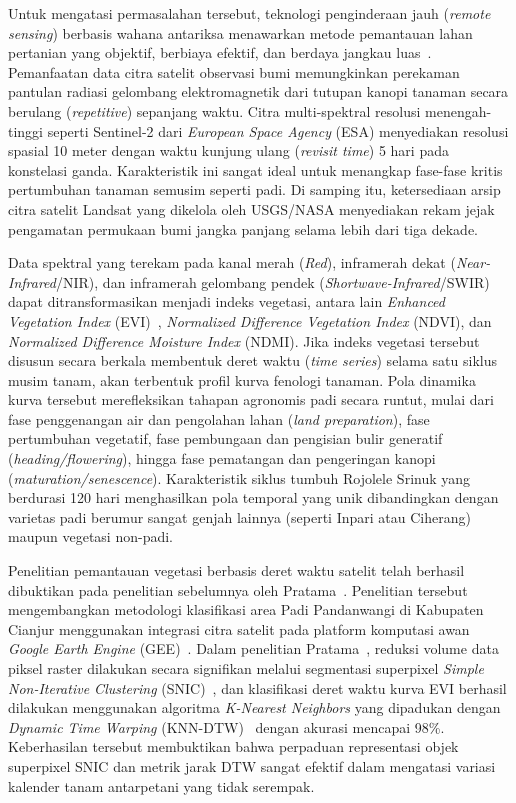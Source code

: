 Untuk mengatasi permasalahan tersebut, teknologi penginderaan jauh (\textit{remote sensing}) berbasis wahana antariksa menawarkan metode pemantauan lahan pertanian yang objektif, berbiaya efektif, dan berdaya jangkau luas~\cite{lillesand:15:remote}. Pemanfaatan data citra satelit observasi bumi memungkinkan perekaman pantulan radiasi gelombang elektromagnetik dari tutupan kanopi tanaman secara berulang (\textit{repetitive}) sepanjang waktu. Citra multi-spektral resolusi menengah-tinggi seperti Sentinel-2 dari \textit{European Space Agency} (ESA) menyediakan resolusi spasial 10 meter dengan waktu kunjung ulang (\textit{revisit time}) 5 hari pada konstelasi ganda. Karakteristik ini sangat ideal untuk menangkap fase-fase kritis pertumbuhan tanaman semusim seperti padi. Di samping itu, ketersediaan arsip citra satelit Landsat yang dikelola oleh USGS/NASA menyediakan rekam jejak pengamatan permukaan bumi jangka panjang selama lebih dari tiga dekade.

Data spektral yang terekam pada kanal merah (\textit{Red}), inframerah dekat (\textit{Near-Infrared}/NIR), dan inframerah gelombang pendek (\textit{Shortwave-Infrared}/SWIR) dapat ditransformasikan menjadi indeks vegetasi, antara lain \textit{Enhanced Vegetation Index} (EVI)~\cite{huete:02:evi}, \textit{Normalized Difference Vegetation Index} (NDVI), dan \textit{Normalized Difference Moisture Index} (NDMI). Jika indeks vegetasi tersebut disusun secara berkala membentuk deret waktu (\textit{time series}) selama satu siklus musim tanam, akan terbentuk profil kurva fenologi tanaman. Pola dinamika kurva tersebut merefleksikan tahapan agronomis padi secara runtut, mulai dari fase penggenangan air dan pengolahan lahan (\textit{land preparation}), fase pertumbuhan vegetatif, fase pembungaan dan pengisian bulir generatif (\textit{heading/flowering}), hingga fase pematangan dan pengeringan kanopi (\textit{maturation/senescence}). Karakteristik siklus tumbuh Rojolele Srinuk yang berdurasi 120 hari menghasilkan pola temporal yang unik dibandingkan dengan varietas padi berumur sangat genjah lainnya (seperti Inpari atau Ciherang) maupun vegetasi non-padi.

Penelitian pemantauan vegetasi berbasis deret waktu satelit telah berhasil dibuktikan pada penelitian sebelumnya oleh Pratama~\cite{pratama:25:vegetasi}. Penelitian tersebut mengembangkan metodologi klasifikasi area Padi Pandanwangi di Kabupaten Cianjur menggunakan integrasi citra satelit pada platform komputasi awan \textit{Google Earth Engine} (GEE)~\cite{gorelick:17:gee}. Dalam penelitian Pratama~\cite{pratama:25:vegetasi}, reduksi volume data piksel raster dilakukan secara signifikan melalui segmentasi superpixel \textit{Simple Non-Iterative Clustering} (SNIC)~\cite{achanta:17:snic}, dan klasifikasi deret waktu kurva EVI berhasil dilakukan menggunakan algoritma \textit{K-Nearest Neighbors} yang dipadukan dengan \textit{Dynamic Time Warping} (KNN-DTW)~\cite{sakoe:78:dtw} dengan akurasi mencapai 98\%. Keberhasilan tersebut membuktikan bahwa perpaduan representasi objek superpixel SNIC dan metrik jarak DTW sangat efektif dalam mengatasi variasi kalender tanam antarpetani yang tidak serempak.


